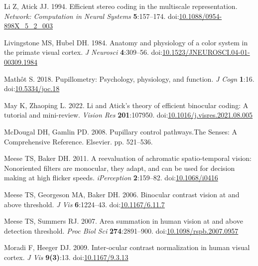 \documentclass[
]{article}
\newlength{\cslhangindent}
\newlength{\cslentryspacingunit} %
\newenvironment{CSLReferences}[2] %
 {%
  \setlength{\parindent}{0pt}
  \ifodd #1
  \let\oldpar\par
  \def\par{\hangindent=\cslhangindent\oldpar}
  \fi
  \setlength{\parskip}{#2\cslentryspacingunit}
 }%
 {}
\begin{document}
\begin{CSLReferences}{1}{0}
\leavevmode{}%
Li Z, Atick JJ. 1994. Efficient stereo coding in the multiscale representation. \emph{Network: Computation in Neural Systems} \textbf{5}:157--174. doi:\href{https://doi.org/10.1088/0954-898X_5_2_003}{10.1088/0954-898X\_5\_2\_003}

\leavevmode{}%
Livingstone MS, Hubel DH. 1984. Anatomy and physiology of a color system in the primate visual cortex. \emph{J Neurosci} \textbf{4}:309--56. doi:\href{https://doi.org/10.1523/JNEUROSCI.04-01-00309.1984}{10.1523/JNEUROSCI.04-01-00309.1984}

\leavevmode{}%
Mathôt S. 2018. Pupillometry: Psychology, physiology, and function. \emph{J Cogn} \textbf{1}:16. doi:\href{https://doi.org/10.5334/joc.18}{10.5334/joc.18}

\leavevmode{}%
May K, Zhaoping L. 2022. Li and {Atick's} theory of efficient binocular coding: A tutorial and mini-review. \emph{Vision Res} \textbf{201}:107950. doi:\href{https://doi.org/10.1016/j.visres.2021.08.005}{10.1016/j.visres.2021.08.005}

\leavevmode{}%
McDougal DH, Gamlin PD. 2008. Pupillary control pathways.The Senses: A Comprehensive Reference. Elsevier. pp. 521--536.

\leavevmode{}%
Meese TS, Baker DH. 2011. A reevaluation of achromatic spatio-temporal vision: Nonoriented filters are monocular, they adapt, and can be used for decision making at high flicker speeds. \emph{{iPerception}} \textbf{2}:159--82. doi:\href{https://doi.org/10.1068/i0416}{10.1068/i0416}

\leavevmode{}%
Meese TS, Georgeson MA, Baker DH. 2006. Binocular contrast vision at and above threshold. \emph{J Vis} \textbf{6}:1224--43. doi:\href{https://doi.org/10.1167/6.11.7}{10.1167/6.11.7}

\leavevmode{}%
Meese TS, Summers RJ. 2007. Area summation in human vision at and above detection threshold. \emph{Proc Biol Sci} \textbf{274}:2891--900. doi:\href{https://doi.org/10.1098/rspb.2007.0957}{10.1098/rspb.2007.0957}

\leavevmode{}%
Moradi F, Heeger DJ. 2009. Inter-ocular contrast normalization in human visual cortex. \emph{J Vis} \textbf{9(3)}:13. doi:\href{https://doi.org/10.1167/9.3.13}{10.1167/9.3.13}


\end{CSLReferences}
\end{document}
